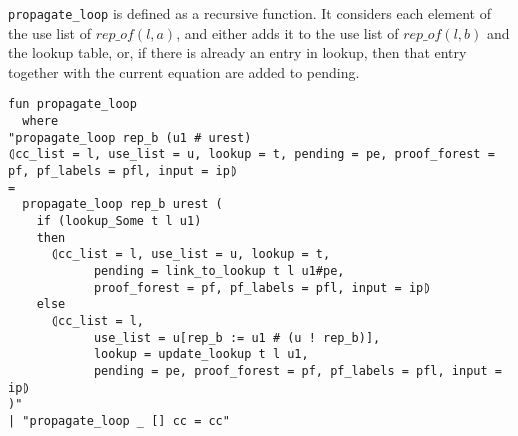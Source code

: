 \lstinline|propagate_loop| is defined as a recursive function. It considers each element of the use list of $rep\_of(l, a)$, and either adds it to the use list of $rep\_of(l, b)$ and the lookup table, or, if there is already an entry in lookup, then that entry together with the current equation are added to pending.

\begin{lstlisting}
fun propagate_loop
  where
"propagate_loop rep_b (u1 # urest)
⦇cc_list = l, use_list = u, lookup = t, pending = pe, proof_forest = pf, pf_labels = pfl, input = ip⦈
=
  propagate_loop rep_b urest (
    if (lookup_Some t l u1)
    then
      ⦇cc_list = l, use_list = u, lookup = t,
            pending = link_to_lookup t l u1#pe,
            proof_forest = pf, pf_labels = pfl, input = ip⦈
    else
      ⦇cc_list = l,
            use_list = u[rep_b := u1 # (u ! rep_b)],
            lookup = update_lookup t l u1,
            pending = pe, proof_forest = pf, pf_labels = pfl, input = ip⦈
)"
| "propagate_loop _ [] cc = cc"
\end{lstlisting}

